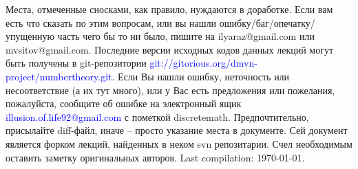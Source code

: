 \documentclass[unicode, 10pt, a4paper, oneside, fleqn]{article}
\begin{document}
\setmainfont{URW Chancery L}
Места, отмеченные сносками, как правило, нуждаются в доработке. Если
вам есть что сказать по этим вопросам, или вы нашли
ошибку/баг/опечатку/упущенную часть чего бы то ни было, пишите на
ilyaraz@gmail.com или mvsitov@gmail.com.
Последние версии исходных кодов данных
лекций могут быть получены в git-репозитории  \textcolor{blue}{
  git://gitorious.org/dmvn-project/numbertheory.git}.  Если Вы нашли
ошибку, неточность или несоответствие (а их тут много), или у Вас
есть предложения или пожелания, пожалуйста, сообщите об ошибке на
электронный ящик \textcolor{blue}{illusion.of.life92@gmail.com} с
пометкой discretemath.  Предпочтительно, присылайте diff-файл, иначе
-- просто указание места в документе.  Сей документ является форком
лекций, найденных в неком svn репозитарии. Счел необходимым оставить
заметку оригинальных авторов. Last compilation: \today.
\setmonofont{DejaVu Sans Mono}
\setsansfont{DejaVu Sans}
\setmainfont{DejaVu Sans}
\tableofcontents

















\end{document}
